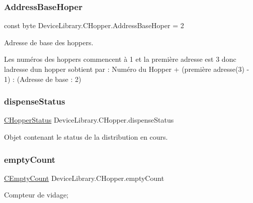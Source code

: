 \subsubsection{\texorpdfstring{Address\+Base\+Hoper}{AddressBaseHoper}}
{\footnotesize\ttfamily const byte Device\+Library.\+C\+Hopper.\+Address\+Base\+Hoper = 2}



Adresse de base des hoppers. 

Les numéros des hoppers commencent à 1 et la première adresse est 3 donc l\textquotesingle{}adresse d\textquotesingle{}un hopper s\textquotesingle{}obtient par \+: Numéro du Hopper + (première adresse(3) -\/ 1) \+: (Adresse de base \+: 2) \mbox{\label{class_device_library_1_1_c_hopper_ab1706fc6c299ceacbbc2d16a11229f41}} 
\subsubsection{\texorpdfstring{dispense\+Status}{dispenseStatus}}
{\footnotesize\ttfamily \mbox{\hyperlink{class_device_library_1_1_c_hopper_1_1_c_hopper_status}{C\+Hopper\+Status}} Device\+Library.\+C\+Hopper.\+dispense\+Status}



Objet contenant le status de la distribution en cours. 

\mbox{\label{class_device_library_1_1_c_hopper_aa38216ffa60bf350c59c59af0de3fa7b}} 
\subsubsection{\texorpdfstring{empty\+Count}{emptyCount}}
{\footnotesize\ttfamily \mbox{\hyperlink{class_device_library_1_1_c_hopper_1_1_c_empty_count}{C\+Empty\+Count}} Device\+Library.\+C\+Hopper.\+empty\+Count}



Compteur de vidage; 

\mbox{\label{class_device_library_1_1_c_hopper_ad9d867e3315d21fea58b64b696fa8d17}} 
